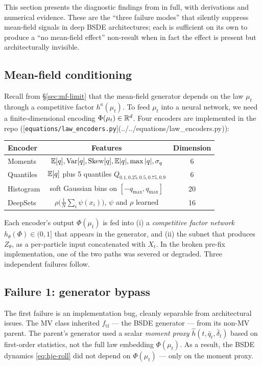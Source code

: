 This section presents the diagnostic findings from \cite{garry2026preprint2} in full, with derivations and numerical evidence. These are the ``three failure modes'' that silently suppress mean-field signals in deep BSDE architectures; each is sufficient on its own to produce a ``no mean-field effect'' non-result when in fact the effect is present but architecturally invisible.

\subsection{Mean-field conditioning}

Recall from \S\ref{sec:mf-limit} that the mean-field generator depends on the law $\mu_t$ through a competitive factor $h^a(\mu_t)$. To feed $\mu_t$ into a neural network, we need a finite-dimensional encoding $\Phi(\mu_t) \in \mathbb{R}^d$. Four encoders are implemented in the repo ([\texttt{equations/law\_encoders.py}](../../equations/law_encoders.py)):

\begin{table}[h]
\centering
\begin{tabular}{@{}lcc@{}}
\toprule
Encoder & Features & Dimension \\ \midrule
Moments & $\mathbb{E}[q], \mathrm{Var}[q], \text{Skew}[q], \mathbb{E}|q|, \max |q|, \sigma_q$ & 6 \\
Quantiles & $\mathbb{E}[q]$ plus 5 quantiles $Q_{0.1, 0.25, 0.5, 0.75, 0.9}$ & 6 \\
Histogram & soft Gaussian bins on $[-q_{\max}, q_{\max}]$ & 20 \\
DeepSets & $\rho\bigl(\frac{1}{N} \sum_i \psi(x_i)\bigr)$, $\psi$ and $\rho$ learned & 16 \\ \bottomrule
\end{tabular}
\end{table}

Each encoder's output $\Phi(\mu_t)$ is fed into (i) a \emph{competitive factor network} $h_\theta(\Phi) \in (0, 1]$ that appears in the generator, and (ii) the subnet that produces $Z_\theta$, as a per-particle input concatenated with $X_t$. In the broken pre-fix implementation, one of the two paths was severed or degraded. Three independent failures follow.

\subsection{Failure 1: generator bypass}

The first failure is an implementation bug, cleanly separable from architectural issues. The MV class inherited $f_{\text{tf}}$ --- the BSDE generator --- from its non-MV parent. The parent's generator used a scalar \emph{moment proxy} $\hat h(t, \bar q_t, \bar \delta_t)$ based on first-order statistics, not the full law embedding $\Phi(\mu_t)$. As a result, the BSDE dynamics \eqref{eq:hje-roll} did not depend on $\Phi(\mu_t)$ --- only on the moment proxy.

